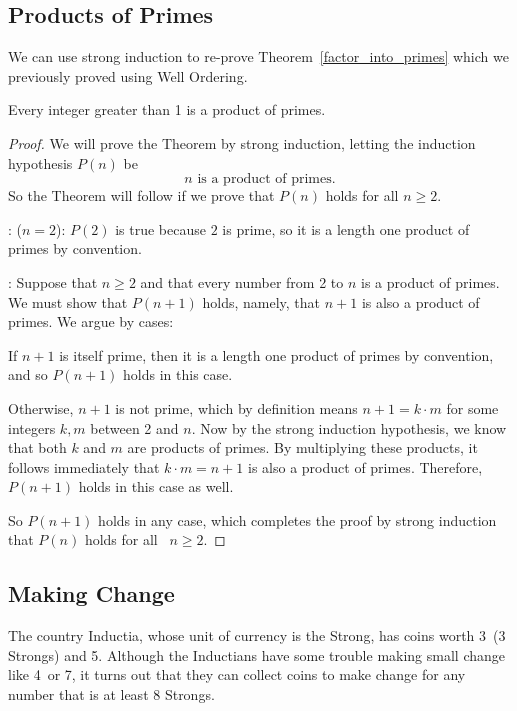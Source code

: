 \subsection{Products of Primes}

We can use strong induction to re-prove
Theorem~\ref{factor_into_primes} which we previously proved using Well
Ordering.

\begin{theorem*}%
Every integer greater than 1 is a product of primes.
\end{theorem*}

\begin{proof}
We will prove the Theorem by strong induction, letting the induction 
hypothesis $P(n)$ be
\[
n \text{ is a product of primes}.
\]
So the Theorem will follow if we prove that $P(n)$ holds for all $n
\geq 2$.

: ($n=2$): $P(2)$ is true because $2$ is prime, so it is
a length one product of primes by convention.

: Suppose that $n \geq 2$ and that every
number from 2 to $n$ is a product of primes.  We must show that
$P(n+1)$ holds, namely, that $n+1$ is also a product of primes.  We
argue by cases:

If $n+1$ is itself prime, then it is a length one product of primes by
convention, and so $P(n+1)$ holds in this case.

Otherwise, $n + 1$ is not prime, which by definition means $n+1 =
k\cdot m$ for some integers $k,m$ between 2 and $n$.  Now by the
strong induction hypothesis, we know that both $k$ and $m$ are
products of primes.  By multiplying these products, it follows
immediately that $k\cdot m = n+1$ is also a product of primes.
Therefore, $P(n+1)$ holds in this case as well.

So $P(n+1)$ holds in any case, which completes the proof by strong
induction that $P(n)$ holds for all ~$n \ge 2$.

\end{proof}

\subsection{Making Change}

The country Inductia, whose unit of currency is the Strong, has coins
worth 3\sg\ (3 Strongs) and 5\sg.  Although the Inductians have some
trouble making small change like 4\sg\ or 7\sg, it turns out that they
can collect coins to make change for any number that is at least 8
Strongs.

